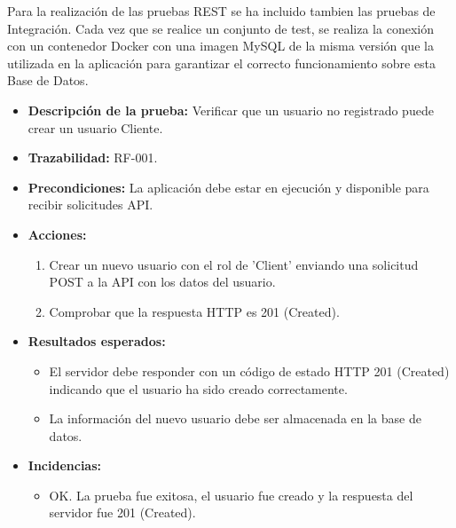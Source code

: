 Para la realización de las pruebas REST se ha incluido tambien las pruebas de Integración. Cada vez que se realice un conjunto de test, se realiza la conexión con 
un contenedor Docker con una imagen MySQL de la misma versión que la utilizada en la aplicación para garantizar el correcto funcionamiento sobre esta Base de Datos.


\begin{itemize}
    \item \textbf{Descripción de la prueba:} Verificar que un usuario no registrado puede crear un usuario Cliente.
    \item \textbf{Trazabilidad:} RF-001.
    \item \textbf{Precondiciones:} La aplicación debe estar en ejecución y disponible para recibir solicitudes API.
    \item \textbf{Acciones:}
    \begin{enumerate} 
        \item Crear un nuevo usuario con el rol de 'Client' enviando una solicitud POST a la API con los datos del usuario.
        \item Comprobar que la respuesta HTTP es 201 (Created).
    \end{enumerate}
    \item \textbf{Resultados esperados:}
    \begin{itemize}
        \item El servidor debe responder con un código de estado HTTP 201 (Created) indicando que el usuario ha sido creado correctamente.
        \item La información del nuevo usuario debe ser almacenada en la base de datos.
    \end{itemize}
    \item \textbf{Incidencias:}
    \begin{itemize}
        \item OK. La prueba fue exitosa, el usuario fue creado y la respuesta del servidor fue 201 (Created).
    \end{itemize}
\end{itemize}

